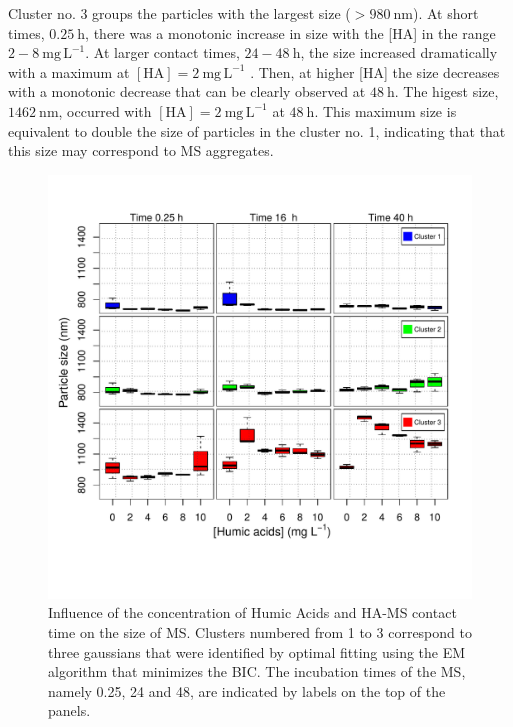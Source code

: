 \documentclass[journal=langd5,manuscript=article]{achemso}
\begin{document}


Cluster no. 3 groups the particles with the largest size
($> 980~\mathrm{nm}$). 
 At short times, 
$0.25~\mathrm{h}$,
there was a monotonic increase in size with the [HA] in the range
$2-8~\mathrm{mg\,L^{-1}}$.
At larger contact times, 
$24-48~\mathrm{h}$, 
the size increased dramatically 
with a maximum at $\mathrm{[HA]} = 2~\mathrm{mg\,L^{-1}}$ .
Then, at higher [HA] the size  decreases with a
monotonic decrease that can be clearly observed at 
$48~\mathrm{h}$.
The higest size, $1462~\mathrm{nm}$,
occurred
with
$\mathrm{[HA]} = 2~\mathrm{mg\,L^{-1}}
$ at 
$48~\mathrm{h}$.
This maximum size is equivalent to double the size of particles in the cluster no. 1, indicating that that this size may correspond to MS aggregates. %

 \begin{figure}
  \includegraphics[width=\linewidth]{Figures/Boxplot_MS_HA_CaCl2_sizes.pdf}
  \caption{Influence of the concentration of Humic Acids and HA-MS contact time on the  size of MS.  Clusters numbered from 1 to 3 correspond to three gaussians that were identified by optimal fitting using the EM algorithm  that minimizes the BIC. The incubation times of the MS,  namely 0.25, 24 and 48, are indicated by labels on the top of the panels.}
  \label{fgr:boxplot_size}
\end{figure}
\end{document}
